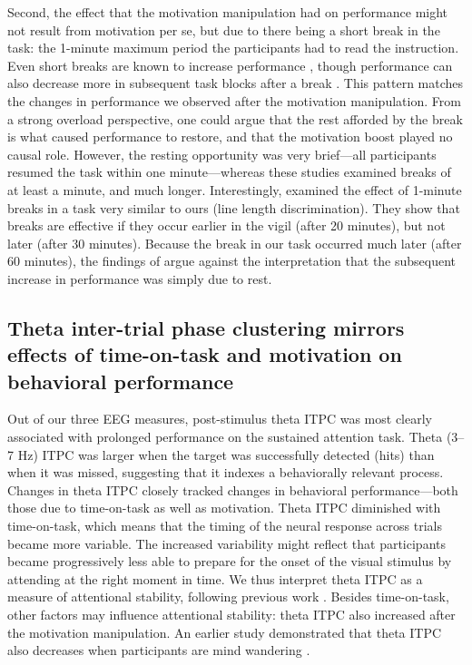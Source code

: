 \documentclass[11pt,]{memoir}
\begin{document}
Second, the effect that the motivation manipulation had on performance might not result from motivation per se, but due to there being a short break in the task: the 1-minute maximum period the participants had to read the instruction. Even short breaks are known to increase performance \autocite{Helton2015}, though performance can also decrease more in subsequent task blocks after a break \autocite{Lim2015}. This pattern matches the changes in performance we observed after the motivation manipulation. From a strong overload perspective, one could argue that the rest afforded by the break is what caused performance to restore, and that the motivation boost played no causal role. However, the resting opportunity was very brief---all participants resumed the task within one minute---whereas these studies examined breaks of at least a minute, and much longer. Interestingly, \textcite{Ross2014} examined the effect of 1-minute breaks in a task very similar to ours (line length discrimination). They show that breaks are effective if they occur earlier in the vigil (after 20 minutes), but not later (after 30 minutes). Because the break in our task occurred much later (after 60 minutes), the findings of \textcite{Ross2014} argue against the interpretation that the subsequent increase in performance was simply due to rest.

\hypertarget{theta-inter-trial-phase-clustering-mirrors-effects-of-time-on-task-and-motivation-on-behavioral-performance}{%
\subsection{Theta inter-trial phase clustering mirrors effects of time-on-task and motivation on behavioral performance}\label{theta-inter-trial-phase-clustering-mirrors-effects-of-time-on-task-and-motivation-on-behavioral-performance}}

Out of our three EEG measures, post-stimulus theta ITPC was most clearly associated with prolonged performance on the sustained attention task. Theta (3--7 Hz) ITPC was larger when the target was successfully detected (hits) than when it was missed, suggesting that it indexes a behaviorally relevant process. Changes in theta ITPC closely tracked changes in behavioral performance---both those due to time-on-task as well as motivation. Theta ITPC diminished with time-on-task, which means that the timing of the neural response across trials became more variable. The increased variability might reflect that participants became progressively less able to prepare for the onset of the visual stimulus by attending at the right moment in time. We thus interpret theta ITPC as a measure of attentional stability, following previous work \autocites{Lutz2009}{Slagter2009}. Besides time-on-task, other factors may influence attentional stability: theta ITPC also increased after the motivation manipulation. An earlier study demonstrated that theta ITPC also decreases when participants are mind wandering \autocite{Baird2014}.
\end{document}

